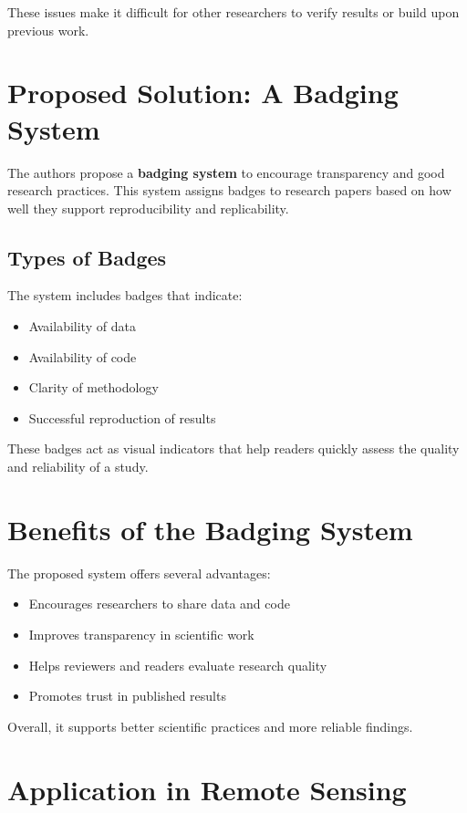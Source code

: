 \documentclass[12pt]{article}
\begin{document}
	These issues make it difficult for other researchers to verify results or build upon previous work.
	
	\section{Proposed Solution: A Badging System}
	
	The authors propose a \textbf{badging system} to encourage transparency and good research practices. This system assigns badges to research papers based on how well they support reproducibility and replicability.
	
	\subsection{Types of Badges}
	
	The system includes badges that indicate:
	\begin{itemize}
		\item Availability of data
		\item Availability of code
		\item Clarity of methodology
		\item Successful reproduction of results
	\end{itemize}
	
	These badges act as visual indicators that help readers quickly assess the quality and reliability of a study.
	
	\section{Benefits of the Badging System}
	
	The proposed system offers several advantages:
	\begin{itemize}
		\item Encourages researchers to share data and code
		\item Improves transparency in scientific work
		\item Helps reviewers and readers evaluate research quality
		\item Promotes trust in published results
	\end{itemize}
	
	Overall, it supports better scientific practices and more reliable findings.
	
	\section{Application in Remote Sensing}
	
\end{document}
